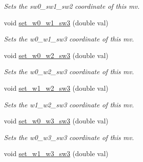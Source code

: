\begin{DoxyCompactItemize}
\begin{DoxyCompactList}\small\item\em Sets the sw0\-\_\-sw1\-\_\-sw2 coordinate of this mv. \end{DoxyCompactList}\item 
\hypertarget{classe3ga_1_1mv_aef618bb8dbcdaabf0192bffd7e598a3f}{void \hyperlink{classe3ga_1_1mv_aef618bb8dbcdaabf0192bffd7e598a3f}{set\-\_\-w0\-\_\-w1\-\_\-sw3} (double val)}\label{classe3ga_1_1mv_aef618bb8dbcdaabf0192bffd7e598a3f}

\begin{DoxyCompactList}\small\item\em Sets the w0\-\_\-w1\-\_\-sw3 coordinate of this mv. \end{DoxyCompactList}\item 
\hypertarget{classe3ga_1_1mv_a8ffde4632424aec14b30d32e77f07c18}{void \hyperlink{classe3ga_1_1mv_a8ffde4632424aec14b30d32e77f07c18}{set\-\_\-w0\-\_\-w2\-\_\-sw3} (double val)}\label{classe3ga_1_1mv_a8ffde4632424aec14b30d32e77f07c18}

\begin{DoxyCompactList}\small\item\em Sets the w0\-\_\-w2\-\_\-sw3 coordinate of this mv. \end{DoxyCompactList}\item 
\hypertarget{classe3ga_1_1mv_a865e67620d8c2f62d5db484da757c133}{void \hyperlink{classe3ga_1_1mv_a865e67620d8c2f62d5db484da757c133}{set\-\_\-w1\-\_\-w2\-\_\-sw3} (double val)}\label{classe3ga_1_1mv_a865e67620d8c2f62d5db484da757c133}

\begin{DoxyCompactList}\small\item\em Sets the w1\-\_\-w2\-\_\-sw3 coordinate of this mv. \end{DoxyCompactList}\item 
\hypertarget{classe3ga_1_1mv_a2d3ca5a774a8ca88286204029adb98de}{void \hyperlink{classe3ga_1_1mv_a2d3ca5a774a8ca88286204029adb98de}{set\-\_\-w0\-\_\-w3\-\_\-sw3} (double val)}\label{classe3ga_1_1mv_a2d3ca5a774a8ca88286204029adb98de}

\begin{DoxyCompactList}\small\item\em Sets the w0\-\_\-w3\-\_\-sw3 coordinate of this mv. \end{DoxyCompactList}\item 
\hypertarget{classe3ga_1_1mv_a9c0e992ca02fc093fe2718f5d7f40ff0}{void \hyperlink{classe3ga_1_1mv_a9c0e992ca02fc093fe2718f5d7f40ff0}{set\-\_\-w1\-\_\-w3\-\_\-sw3} (double val)}\label{classe3ga_1_1mv_a9c0e992ca02fc093fe2718f5d7f40ff0}


\end{DoxyCompactItemize}
